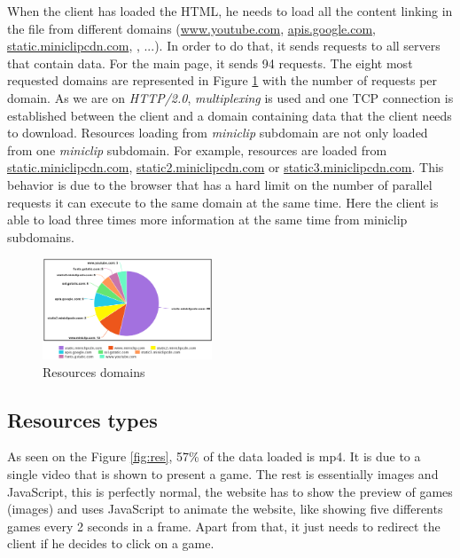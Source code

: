 \documentclass{article}
\begin{document}
When the client has loaded the HTML, he needs to load all the content linking in the file from different domains (\url{www.youtube.com}, \url{apis.google.com}, \url{static.miniclipcdn.com}, , ...). In order to do that, it sends requests to all servers that contain data. For the main page, it sends 94 requests. The eight most requested domains are represented in Figure \ref{fig:resdom} with the number of requests per domain. As we are on \textit{HTTP/2.0}, \textit{multiplexing} is used and one TCP connection is established between the client and a domain containing data that the client needs to download.
Resources loading from \textit{miniclip} subdomain are not only loaded from one \textit{miniclip} subdomain. For example, resources are loaded from \url{static.miniclipcdn.com}, \url{static2.miniclipcdn.com} or \url{static3.miniclipcdn.com}. This behavior is due to the browser that has a hard limit on the number of parallel requests it can execute to the same domain at the same time. Here the client is able to load three times more information at the same time from miniclip subdomains.

\begin{figure}[h!]
    \centering
    \includegraphics[width=0.45\textwidth]{res/imgs/domains.png}
    \caption{Resources domains}
    \label{fig:resdom}
\end{figure}

\subsection{Resources types}
\label{sub:res}

As seen on the Figure \ref{fig:res}, 57\% of the data loaded is mp4. It is due to a single video that is shown to present a game. The rest is essentially images and JavaScript, this is perfectly normal, the website has to show the preview of games (images) and uses JavaScript to animate the website, like showing five differents games every 2 seconds in a frame. Apart from that, it just needs to redirect the client if he decides to click on a game.
\end{document}
